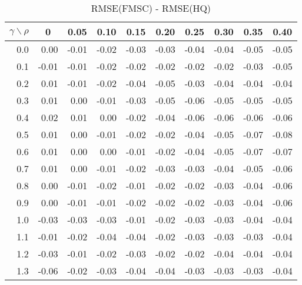 \documentclass[12pt]{article}
\begin{document}
%
\begin{table}[!tbp]
\caption{RMSE(FMSC) - RMSE(HQ)}
 \begin{center}
 \begin{tabular}{r|rrrrrrrrr}\hline\hline
\multicolumn{1}{c|}{$\gamma\backslash\rho$}&\multicolumn{1}{c}{0}&\multicolumn{1}{c}{0.05}&\multicolumn{1}{c}{0.10}&\multicolumn{1}{c}{0.15}&\multicolumn{1}{c}{0.20}&\multicolumn{1}{c}{0.25}&\multicolumn{1}{c}{0.30}&\multicolumn{1}{c}{0.35}&\multicolumn{1}{c}{0.40}\tabularnewline
\hline
0.0& 0.00&-0.01&-0.02&-0.03&-0.03&-0.04&-0.04&-0.05&-0.05\tabularnewline
0.1&-0.01&-0.01&-0.02&-0.02&-0.02&-0.02&-0.02&-0.03&-0.05\tabularnewline
0.2& 0.01&-0.01&-0.02&-0.04&-0.05&-0.03&-0.04&-0.04&-0.04\tabularnewline
0.3& 0.01& 0.00&-0.01&-0.03&-0.05&-0.06&-0.05&-0.05&-0.05\tabularnewline
0.4& 0.02& 0.01& 0.00&-0.02&-0.04&-0.06&-0.06&-0.06&-0.06\tabularnewline
0.5& 0.01& 0.00&-0.01&-0.02&-0.02&-0.04&-0.05&-0.07&-0.08\tabularnewline
0.6& 0.01& 0.00& 0.00&-0.01&-0.02&-0.04&-0.05&-0.07&-0.07\tabularnewline
0.7& 0.01& 0.00&-0.01&-0.02&-0.03&-0.03&-0.04&-0.05&-0.06\tabularnewline
0.8& 0.00&-0.01&-0.02&-0.01&-0.02&-0.02&-0.03&-0.04&-0.06\tabularnewline
0.9& 0.00&-0.01&-0.01&-0.02&-0.02&-0.02&-0.03&-0.04&-0.06\tabularnewline
1.0&-0.03&-0.03&-0.03&-0.01&-0.02&-0.03&-0.03&-0.04&-0.04\tabularnewline
1.1&-0.01&-0.02&-0.04&-0.04&-0.02&-0.03&-0.03&-0.03&-0.04\tabularnewline
1.2&-0.03&-0.01&-0.02&-0.03&-0.02&-0.02&-0.04&-0.04&-0.04\tabularnewline
1.3&-0.06&-0.02&-0.03&-0.04&-0.04&-0.03&-0.03&-0.03&-0.04\tabularnewline
\hline
\end{tabular}

\end{center}

\end{table}
\end{document}
